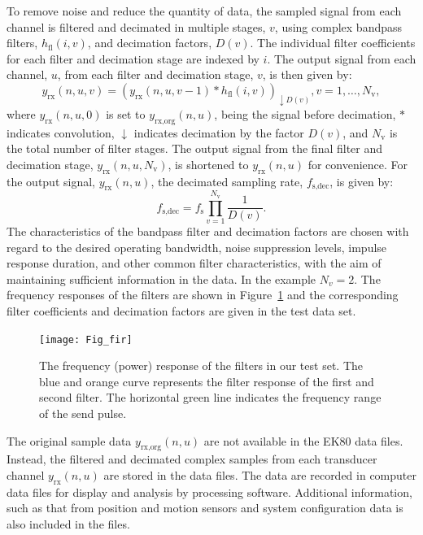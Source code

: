 \documentclass[preprint,12pt,TurnOnLineNumbers]{JASAnew}
\newcommand{\samplesymt}{n}
\newcommand{\genidxsym}{i}
\newcommand{\channelsym}{u}
\newcommand{\stagesym}{v}
\newcommand{\nstages}{N_{\textrm{v}}}
\newcommand{\fs}{f_{\textrm{s}}}
\newcommand{\fsdec}{f_{\textrm{s,dec}}}
\newcommand{\yrx}{y_{\textrm{rx}}}
\newcommand{\yrxorg}{y_{\textrm{rx,org}}}
\newcommand{\decfac}{D}
\newcommand{\hfl}{h_{\textrm{fl}}}
\begin{document}
To remove noise and reduce the quantity of data, the sampled signal from each channel is filtered and decimated in multiple stages, $\stagesym$, using complex bandpass filters, $\hfl(\genidxsym,\stagesym)$, and decimation factors, $\decfac(\stagesym)$. The individual filter coefficients for each filter and decimation stage are indexed by $\genidxsym$. The output signal from each channel, $\channelsym$, from each filter and decimation stage, $\stagesym$, is then given by:
%
\begin{equation}
\label{eq:yrx}
\yrx(\samplesymt,\channelsym,\stagesym) = \left( \yrx(\samplesymt,\channelsym,\stagesym-1) * \hfl(\genidxsym,\stagesym) \right)_{\downarrow \decfac(\stagesym)}, 
\stagesym = 1,\ldots,\nstages,
\end{equation}
%
where $\yrx(\samplesymt,\channelsym,0)$ is set to $\yrxorg(\samplesymt,\channelsym)$, being the signal before decimation, $*$ indicates convolution, $\downarrow$ indicates decimation by the factor $\decfac(\stagesym)$, and $\nstages$ is the total number of filter stages. The output signal from the final filter and decimation stage, $\yrx(\samplesymt,\channelsym,\nstages)$, is shortened to $\yrx(\samplesymt,\channelsym)$ for convenience. For the output signal, $\yrx(\samplesymt,\channelsym)$, the decimated sampling rate, $\fsdec$, is given by:
%
\begin{equation}
\label{eq:fsdec}
\fsdec = \fs\prod_{\stagesym=1}^{\nstages} \frac{1}{\decfac(\stagesym)}.
\end{equation}
%
The characteristics of the bandpass filter and decimation factors are chosen with regard to the desired operating bandwidth, noise suppression levels, impulse response duration, and other common filter characteristics, with the aim of maintaining sufficient information in the data. In the example $N_v=2$. The frequency responses of the filters are shown in Figure~\ref{fi:fir} and the corresponding filter coefficients and decimation factors are given in the test data set.

\begin{figure}
\texttt{[image: Fig\_fir]}
\caption{\label{fi:fir} The frequency (power) response of the filters in our test set. The blue and orange curve represents the filter response of the first and second filter. The horizontal green line indicates the frequency range of the send pulse.}
\end{figure}

The original sample data $\yrxorg(\samplesymt,\channelsym)$ are not available in the EK80 data files. Instead, the filtered and decimated complex samples from each transducer channel $\yrx(\samplesymt,\channelsym)$ are stored in the data files. The data are recorded in computer data files for display and analysis by processing software. Additional information, such as that from position and motion sensors and system configuration data is also included in the files.
\end{document}
